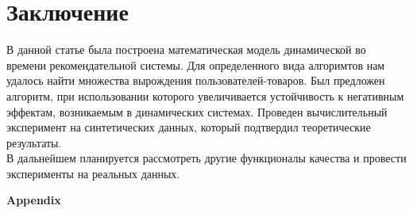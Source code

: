 \documentclass{article}
\begin{document}
\section{Заключение}

В данной статье была построена математическая модель динамической во времени рекомендательной системы. Для определенного вида алгоримтов нам удалось найти множества вырождения пользователей-товаров. Был предложен алгоритм, при использовании которого увеличивается устойчивость к негативным эффектам, возникаемым в динамических системах. Проведен вычислительный эксперимент на синтетических данных, который подтвердил теоретические результаты. \\
В дальнейшем планируется рассмотреть другие функционалы качества и провести эксперименты на реальных данных.

\newpage

  

\begin{center}
    \LARGE \textbf{Appendix}
\end{center}
\normalsize

  

\appendix
\end{document}
